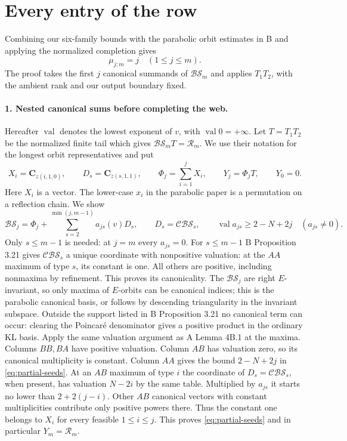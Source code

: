 \newpage
\begingroup
\setlength{\parskip}{.32em}
\setlength{\abovedisplayskip}{7pt plus 2pt minus 3pt}
\setlength{\belowdisplayskip}{7pt plus 2pt minus 3pt}
\section{Every entry of the row}
\label{sec:partialrows}
Combining our six-family bounds with the parabolic orbit estimates in B and applying the normalized completion gives
\[
                 \boxed{\ \mu_{j;m}=j\quad(1\le j\le m).\ }
\]
The proof takes the first \(j\) canonical summands of \(\mathcal{BS}_m\)
and applies \(T_1T_2\), with the ambient rank and our output boundary fixed.

\paragraph{1. Nested canonical sums before completing the web.}
Hereafter $\operatorname{val}$ denotes the lowest exponent of $v$, with $\operatorname{val}0=+\infty$. Let \(T=T_1T_2\) be the normalized finite tail which gives \(\mathcal{BS}_m T=\mathcal R_m\).
We use their notation for the longest orbit representatives and put
\[
 X_i=\mathbf C_{z(i,1,0)},\qquad D_s=\mathbf C_{z(s,1,1)},\qquad
 \Phi_j=\sum_{i=1}^j X_i,\qquad Y_j=\Phi_j T,\qquad Y_0=0 .
\]
Here \(X_i\) is a vector. The lower-case \(x_i\) in the parabolic paper is a permutation on a reflection chain.
We show
\begin{equation}\label{eq:partial-seeds}
 \mathcal{BS}_j=\Phi_j+\sum_{s=2}^{\min(j,m-1)}a_{js}(v)D_s,\qquad
 D_s=\mathcal{CBS}_s,\qquad
 \operatorname{val}a_{js}\ge 2-N+2j\quad(a_{js}\ne0).
\end{equation}
Only \(s\le m-1\) is needed: at \(j=m\) every \(a_{js}=0\). For \(s\le m-1\) B Proposition 3.21 gives \(\mathcal{CBS}_s\) a unique coordinate with nonpositive valuation: at the \(AA\) maximum of type \(s\), its constant is one. All others are positive, including nonmaxima by refinement. This proves its canonicality. The \(\mathcal{BS}_j\) are right \(E\)-invariant, so only maxima of \(E\)-orbits can be canonical indices; this is the parabolic canonical basis, or follows by descending triangularity in the invariant subspace. Outside the support listed in B Proposition 3.21 no canonical term can occur: clearing the Poincar\'e denominator gives a positive product in the ordinary KL basis. Apply the same valuation argument as A Lemma 4B.1 at the maxima. Columns \(BB,BA\) have positive valuation. Column \(AB\) has valuation zero, so its canonical multiplicity is constant. Column \(AA\) gives the bound \(2-N+2j\) in \eqref{eq:partial-seeds}. At an \(AB\) maximum of type \(i\) the coordinate of \(D_s=\mathcal{CBS}_s\), when present, has valuation \(N-2i\) by the same table. Multiplied by \(a_{js}\) it starts no lower than \(2+2(j-i)\). Other \(AB\) canonical vectors with constant multiplicities contribute only positive powers there. Thus the constant one belongs to \(X_i\) for every feasible \(1\le i\le j\). This proves \eqref{eq:partial-seeds} and in particular \(Y_m=\mathcal R_m\).

